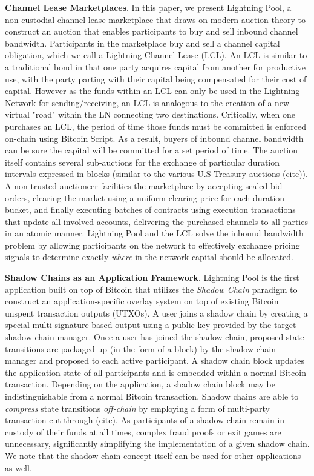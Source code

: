 \documentclass[10pt,a4paper]{article}
\theoremstyle{definition}
\begin{document}
\textbf{Channel Lease Marketplaces}. In this paper, we present Lightning Pool,
a non-custodial channel lease marketplace that draws on modern auction theory
to construct an auction that enables participants to buy and sell inbound
channel bandwidth. Participants in the marketplace buy and sell a channel
capital obligation, which we call a Lightning Channel Lease (LCL). An LCL is
similar to a traditional bond in that one party acquires capital from another
for productive use, with the party parting with their capital being compensated
for their cost of capital. However as the funds within an LCL can only be used
in the Lightning Network for sending/receiving, an LCL is analogous to the
creation of a new virtual "road" within the LN connecting two destinations.
Critically, when one purchases an LCL, the period of time those funds must be
committed is enforced on-chain using Bitcoin Script. As a result, buyers of
inbound channel bandwidth can be sure the capital will be committed for a set
period of time.  The auction itself contains several sub-auctions for the
exchange of particular duration intervals expressed in blocks (similar to the
various U.S Treasury auctions (cite)). A non-trusted auctioneer facilities the
marketplace by accepting sealed-bid orders, clearing the market using a uniform
clearing price for each duration bucket, and finally executing batches of
contracts using execution transactions that update all involved accounts,
delivering the purchased channels to all parties in an atomic manner. Lightning
Pool and the LCL solve the inbound bandwidth problem by allowing participants
on the network to effectively exchange pricing signals to determine exactly
\emph{where} in the network capital should be allocated.


\textbf{Shadow Chains as an Application Framework}. Lightning Pool is the first
application built on top of Bitcoin that utilizes the \emph{Shadow Chain}
paradigm to construct an application-specific overlay system on top of existing
Bitcoin unspent transaction outputs (UTXOs). A user joins a shadow chain by
creating a special multi-signature based output using a public key provided by
the target shadow chain manager. Once a user has joined the shadow chain,
proposed state transitions are packaged up (in the form of a block) by the
shadow chain manager and proposed to each active participant. A shadow chain
block updates the application state of all participants and is embedded within
a normal Bitcoin transaction. Depending on the application, a shadow chain
block may be indistinguishable from a normal Bitcoin transaction. Shadow chains
are able to \emph{compress} state transitions \emph{off-chain} by employing a
form of multi-party transaction cut-through (cite). As participants of a
shadow-chain remain in custody of their funds at all times, complex fraud
proofs or exit games are unnecessary, significantly simplifying the
implementation of a given shadow chain. We note that the shadow chain concept
itself can be used for other applications as well.
\end{document}
